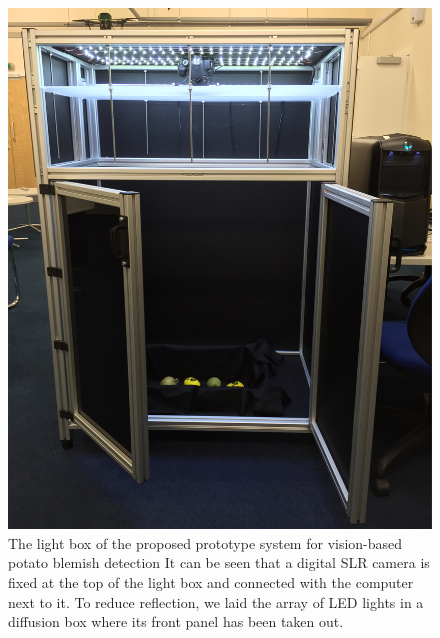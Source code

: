 \documentclass[twocolumn]{svjour3}          %
\begin{document}
\begin{figure}[t]
\centering
\includegraphics[width=0.95\linewidth]{lightbox.jpg}
\caption{The light box of the proposed prototype system for vision-based potato blemish detection It can be seen that a digital SLR camera is fixed at the top of the light box and connected with the computer next to it. To reduce reflection, we laid the array of LED lights in a diffusion box where its front panel has been taken out.}
\label{fig:pro}
\end{figure}
\end{document}
